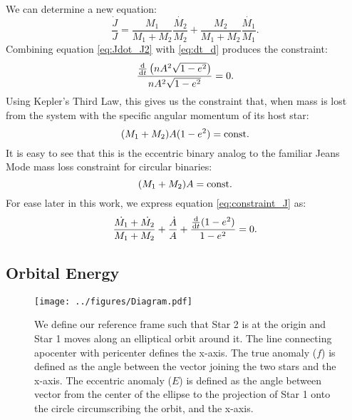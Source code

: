 \documentclass{emulateapj}
\begin{document}
We can determine a new equation:
\begin{equation}
\frac{\dot{J}}{J} = \frac{M_1}{M_1 + M_2} \frac{\dot{M_2}}{M_2} +  \frac{M_2}{M_1 + M_2} \frac{\dot{M_1}}{M_1}. \label{eq:Jdot_J2}
\end{equation}
Combining equation \ref{eq:Jdot_J2} with \ref{eq:dt_d} produces the constraint:
\begin{equation}
\frac{\frac{{\rm d}}{{\rm d}t} \left( n A^2 \sqrt{1-e^2} \right)}{n A^2 \sqrt{1-e^2}} = 0.
\end{equation}
Using Kepler's Third Law, this gives us the constraint that, when mass is lost from the system with the specific angular momentum of its host star:
\begin{equation}
(M_1+M_2) A (1-e^2) = {\rm const.} \label{eq:constraint_J}
\end{equation}
It is easy to see that this is the eccentric binary analog to the familiar Jeans Mode mass loss constraint for circular binaries:
\begin{equation}
(M_1 + M_2) A = {\rm const.}
\end{equation}
For ease later in this work, we express equation \ref{eq:constraint_J} as:
\begin{equation}
\frac{\dot{M_1} + \dot{M_2}}{M_1 + M_2} + \frac{\dot{A}}{A} + \frac{\frac{{\rm d}}{{\rm d}t} (1-e^2)}{1-e^2} = 0. \label{eq:ang_mom}
\end{equation}

\subsection{Orbital Energy}

\begin{figure}[h!]
\begin{center}
\texttt{[image: ../figures/Diagram.pdf]}
\caption{\label{fig:diagram} We define our reference frame such that Star 2 is at the origin and Star 1 moves along an elliptical orbit around it. The line connecting apocenter with pericenter defines the x-axis. The true anomaly ($f$) is defined as the angle between the vector joining the two stars and the x-axis. The eccentric anomaly ($E$) is defined as the angle between vector from the center of the ellipse to the projection of Star 1 onto the circle circumscribing the orbit, and the x-axis. }
\end{center}
\end{figure}
\end{document}
